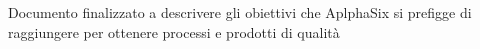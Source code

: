 Documento finalizzato a descrivere gli obiettivi che AplphaSix si prefigge di raggiungere per ottenere processi e prodotti di qualità